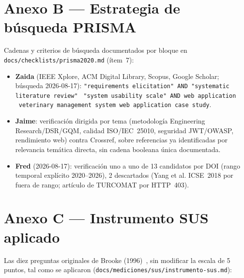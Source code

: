 \section{Anexo B --- Estrategia de b\'usqueda PRISMA}
\label{sec:anexo-prisma-busqueda}

Cadenas y criterios de b\'usqueda documentados por bloque en
\texttt{docs/checklists/prisma2020.md} (\'item~7):

\begin{itemize}[nosep]
  \item \textbf{Zaida} (IEEE Xplore, ACM Digital Library, Scopus, Google
    Scholar; b\'usqueda 2026-08-17):
    \texttt{"requirements elicitation" AND "systematic literature review"}
    \textbullet\ \texttt{"system usability scale" AND web application}
    \textbullet\ \texttt{veterinary management system web application case
    study}.
  \item \textbf{Jaime}: verificaci\'on dirigida por tema (metodolog\'ia
    Engineering Research/DSR/GQM, calidad ISO/IEC~25010, seguridad
    JWT/OWASP, rendimiento web) contra Crossref, sobre referencias ya
    identificadas por relevancia tem\'atica directa, sin cadena booleana
    \'unica documentada.
  \item \textbf{Fred} (2026-08-17): verificaci\'on uno a uno de 13
    candidatos por DOI (rango temporal expl\'icito 2020--2026), 2
    descartados (Yang et al. ICSE~2018 por fuera de rango; art\'iculo de
    TURCOMAT por HTTP~403).
\end{itemize}

\section{Anexo C --- Instrumento SUS aplicado}
\label{sec:anexo-sus}

Las diez preguntas originales de Brooke (1996)~\cite{sus-brooke1996}, sin
modificar la escala de 5 puntos, tal como se aplicaron
(\texttt{docs/mediciones/sus/instrumento-sus.md}):

